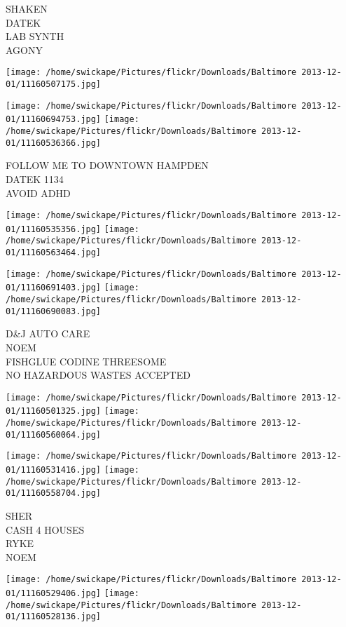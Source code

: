 \documentclass[10pt,letterpaper]{article}
\begin{document}
SHAKEN\\
DATEK\\
LAB SYNTH\\
AGONY\\
\pagebreak

\texttt{[image: /home/swickape/Pictures/flickr/Downloads/Baltimore 2013-12-01/11160507175.jpg]}

\vspace{0.25in}
\texttt{[image: /home/swickape/Pictures/flickr/Downloads/Baltimore 2013-12-01/11160694753.jpg]}
\texttt{[image: /home/swickape/Pictures/flickr/Downloads/Baltimore 2013-12-01/11160536366.jpg]}

FOLLOW ME TO DOWNTOWN HAMPDEN\\
DATEK 1134\\
AVOID ADHD\\
\pagebreak

\texttt{[image: /home/swickape/Pictures/flickr/Downloads/Baltimore 2013-12-01/11160535356.jpg]}
\texttt{[image: /home/swickape/Pictures/flickr/Downloads/Baltimore 2013-12-01/11160563464.jpg]}

\texttt{[image: /home/swickape/Pictures/flickr/Downloads/Baltimore 2013-12-01/11160691403.jpg]}
\texttt{[image: /home/swickape/Pictures/flickr/Downloads/Baltimore 2013-12-01/11160690083.jpg]}

D\&J AUTO CARE\\
NOEM\\
FISHGLUE CODINE THREESOME\\
NO HAZARDOUS WASTES ACCEPTED\\
\pagebreak

\texttt{[image: /home/swickape/Pictures/flickr/Downloads/Baltimore 2013-12-01/11160501325.jpg]}
\texttt{[image: /home/swickape/Pictures/flickr/Downloads/Baltimore 2013-12-01/11160560064.jpg]}

\texttt{[image: /home/swickape/Pictures/flickr/Downloads/Baltimore 2013-12-01/11160531416.jpg]}
\texttt{[image: /home/swickape/Pictures/flickr/Downloads/Baltimore 2013-12-01/11160558704.jpg]}

SHER\\
CASH 4 HOUSES\\
RYKE\\
NOEM\\
\pagebreak

\texttt{[image: /home/swickape/Pictures/flickr/Downloads/Baltimore 2013-12-01/11160529406.jpg]}
\texttt{[image: /home/swickape/Pictures/flickr/Downloads/Baltimore 2013-12-01/11160528136.jpg]}
\end{document}
